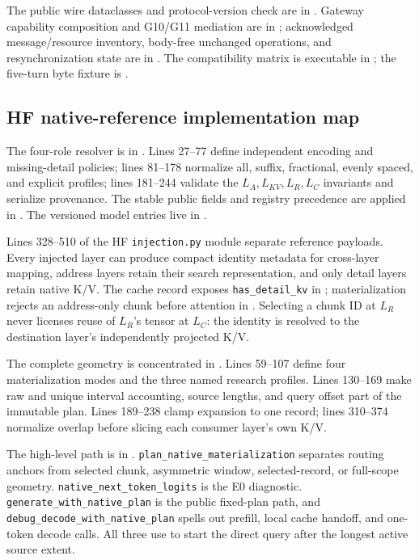 \documentclass[11pt]{article}
\begin{document}
The public wire dataclasses and protocol-version check are in
. Gateway capability composition and G10/G11
mediation are in ; acknowledged message/resource
inventory, body-free unchanged operations, and resynchronization state are in
. The compatibility matrix is executable in
; the five-turn byte fixture is
.

\subsection{HF native-reference implementation map}

The four-role resolver is in
. Lines 27--77 define independent
encoding and missing-detail policies; lines 81--178 normalize all, suffix,
fractional, evenly spaced, and explicit profiles; lines 181--244 validate the
$L_A,L_{KV},L_R,L_C$ invariants and serialize provenance. The stable public
fields and registry precedence are applied in
. The versioned model entries live in
.

Lines 328--510 of the HF \texttt{injection.py} module separate reference
payloads. Every injected layer can produce
compact identity metadata for cross-layer mapping, address layers retain their
search representation, and only detail layers retain native K/V. The cache
record exposes \texttt{has\_detail\_kv} in
; materialization rejects an address-only
chunk before attention in . Selecting a
chunk ID at $L_R$ never licenses reuse of $L_R$'s tensor at $L_C$: the identity
is resolved to the destination layer's independently projected K/V.

The complete geometry is concentrated in
. Lines 59--107 define four
materialization modes and the three named research profiles. Lines 130--169
make raw and unique interval accounting, source lengths, and query offset part
of the immutable plan. Lines 189--238 clamp expansion to one record; lines
310--374 normalize overlap before slicing each consumer layer's own K/V.

The high-level path is in .
\texttt{plan\_native\_materialization} separates routing anchors from selected
chunk, asymmetric window, selected-record, or full-scope geometry.
\texttt{native\_next\_token\_logits} is the E0 diagnostic.
\texttt{generate\_with\_native\_plan} is the public fixed-plan path, and
\texttt{debug\_decode\_with\_native\_plan} spells out prefill, local cache
handoff, and one-token decode calls. All three use
 to start the direct query after
the longest active source extent.
\end{document}
